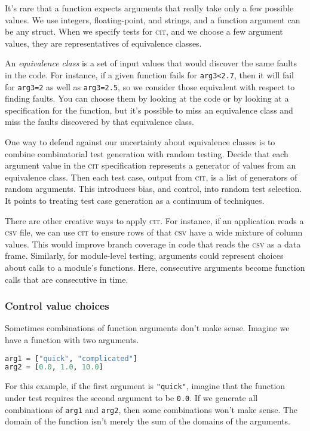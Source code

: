 \documentclass{juliacon}
\newcommand{\cit}{\textsc{cit}\xspace}
\newcommand{\csv}{\textsc{csv}\xspace}
\begin{document}
\vskip 6pt
It's rare that a function expects arguments that really take only a few possible values. We use integers, floating-point, and strings, and a function argument can be any struct. When we specify tests for \cit, and we choose a few argument values, they are representatives of equivalence classes.

\vskip 6pt
An \emph{equivalence class} is a set of input values that would discover the same faults in the code. For instance, if a given function fails for \verb|arg3<2.7|, then it will fail for \verb|arg3=2| as well as \verb|arg3=2.5|, so we consider those equivalent with respect to finding faults. You can choose them by looking at the code or by looking at a specification for the function, but it's possible to miss an equivalence class and miss the faults discovered by that equivalence class.

\vskip 6pt
One way to defend against our uncertainty about equivalence classes is to combine combinatorial test generation with random testing. Decide that each argument value in the \cit specification represents a generator of values from an equivalence class. Then each test case, output from \cit, is a list of generators of random arguments. This introduces bias, and control, into random test selection. It points to treating test case generation as a continuum of techniques.

\vskip 6pt
There are other creative ways to apply \cit. For instance, if an application reads a \csv file, we can use \cit to ensure rows of that \csv have a wide mixture of column values. This would improve branch coverage in code that reads the \csv as a data frame. Similarly, for module-level testing, arguments could represent choices about calls to a module's functions. Here, consecutive arguments become function calls that are consecutive in time.


\subsubsection{Control value choices}

Sometimes combinations of function arguments don't make sense. Imagine we have a function with two arguments.
\begin{lstlisting}[language=Julia]
arg1 = ["quick", "complicated"]
arg2 = [0.0, 1.0, 10.0]
\end{lstlisting}
For this example, if the first argument is \verb|"quick"|, imagine that the function under test requires the second argument to be \verb|0.0|. If we generate all combinations of \verb|arg1| and \verb|arg2|, then some combinations won't make sense. The domain of the function isn't merely the sum of the domains of the arguments.
\end{document}
